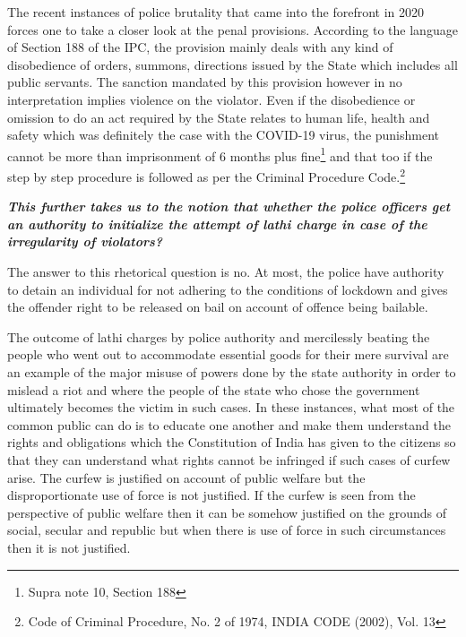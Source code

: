 \begin{multicols}{2}
\noi
The recent instances of police brutality that came into the forefront in 2020 forces one to take
a closer look at the penal provisions. According to the language of Section 188 of the IPC,
the provision mainly deals with any kind of disobedience of orders, summons, directions
issued by the State which includes all public servants. The sanction mandated by this
provision however in no interpretation implies violence on the violator. Even if the
disobedience or omission to do an act required by the State relates to human life, health and
safety which was definitely the case with the COVID-19 virus, the punishment cannot be more than imprisonment of 6 months plus fine\footnote{Supra note 10, Section 188} and that too if the step by step procedure is
followed as per the Criminal Procedure Code.\footnote{Code of Criminal Procedure, No. 2 of 1974, INDIA CODE (2002), Vol. 13}

\noi
{\it\bfseries This further takes us to the notion that whether the police officers get an authority to
initialize the attempt of lathi charge in case of the irregularity of violators?}

\noi
The answer to this rhetorical question is no. At most, the police have authority to detain an
individual for not adhering to the conditions of lockdown and gives the offender right to be
released on bail on account of offence being bailable.

\noi
The outcome of lathi charges by police authority and mercilessly beating the people who
went out to accommodate essential goods for their mere survival are an example of the major
misuse of powers done by the state authority in order to mislead a riot and where the people
of the state who chose the government ultimately becomes the victim in such cases. In these
instances, what most of the common public can do is to educate one another and make them
understand the rights and obligations which the Constitution of India has given to the citizens
so that they can understand what rights cannot be infringed if such cases of curfew arise. The
curfew is justified on account of public welfare but the disproportionate use of force is not
justified. If the curfew is seen from the perspective of public welfare then it can be somehow
justified on the grounds of social, secular and republic but when there is use of force in such
circumstances then it is not justified.



\end{multicols}
